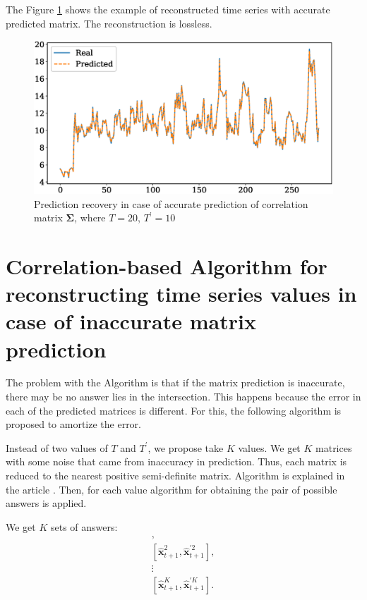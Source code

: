 \documentclass[12pt]{article}
\begin{document}
{The Figure \ref{fig:fig3} shows the example of reconstructed time series with accurate predicted matrix. The reconstruction is lossless.

\begin{figure}[!htbp]
	\centering
	\includegraphics[width=\textwidth]{IdealRecovery.eps}
	\caption{Prediction recovery in case of accurate prediction of correlation matrix $\mathbf{\Sigma}$, where $T=20$, $T^\prime=10$}
	\label{fig:fig3}
\end{figure}

\section{Correlation-based Algorithm for reconstructing time series values in case of inaccurate matrix prediction}

The problem with the Algorithm is that if the matrix prediction is inaccurate, there may be no answer lies in the intersection. This happens because the error in each of the predicted matrices is different. For this, the following algorithm is proposed to amortize the error.

Instead of two values of $T$ and $T^\prime$, we propose take $K$ values. We get $K$ matrices with some noise that came from inaccuracy in prediction. Thus, each matrix is reduced to the nearest positive semi-definite matrix. Algorithm is explained in the article \cite{HIGHAM1988103}.
Then, for each value algorithm for obtaining the pair of possible answers is applied.

We get $K$ sets of answers:
\begin{gather*}
	[\hat{\mathbf{x}}_{t+1}^1, \hat{\mathbf{x}}^{\prime 1}_{t+1}],\\
	[\hat{\mathbf{x}}_{t+1}^2, \hat{\mathbf{x}}^{\prime 2}_{t+1}],\\
	\vdots \\
	[\hat{\mathbf{x}}_{t+1}^K, \hat{\mathbf{x}}^{\prime K}_{t+1}].
\end{gather*}

}
\end{document}
